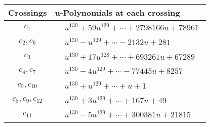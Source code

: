 \documentclass[1p]{elsarticle_modified}
\theoremstyle{definition}
\begin{document}
\begin{tabular}{m{50pt}|m{274pt}}
Crossings & \hspace{64pt}u-Polynomials at each crossing \\
\hline $$\begin{aligned}c_{1}\end{aligned}$$&$\begin{aligned}
&u^{130}+59 u^{129}+\cdots+2798166 u+78961
\end{aligned}$\\
\hline $$\begin{aligned}c_{2},c_{6}\end{aligned}$$&$\begin{aligned}
&u^{130}- u^{129}+\cdots-2132 u+281
\end{aligned}$\\
\hline $$\begin{aligned}c_{3}\end{aligned}$$&$\begin{aligned}
&u^{130}+17 u^{128}+\cdots+693261 u+67289
\end{aligned}$\\
\hline $$\begin{aligned}c_{4},c_{7}\end{aligned}$$&$\begin{aligned}
&u^{130}-4 u^{129}+\cdots-77445 u+8257
\end{aligned}$\\
\hline $$\begin{aligned}c_{5},c_{10}\end{aligned}$$&$\begin{aligned}
&u^{130}+u^{129}+\cdots+u+1
\end{aligned}$\\
\hline $$\begin{aligned}c_{8},c_{9},c_{12}\end{aligned}$$&$\begin{aligned}
&u^{130}+3 u^{129}+\cdots+167 u+49
\end{aligned}$\\
\hline $$\begin{aligned}c_{11}\end{aligned}$$&$\begin{aligned}
&u^{130}-5 u^{129}+\cdots+300381 u+21815
\end{aligned}$\\
\hline
\end{tabular}\\~\\
\end{document}
